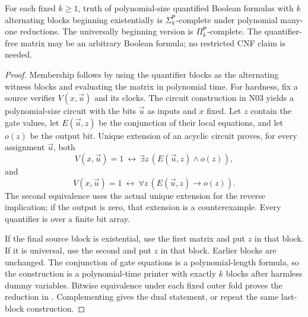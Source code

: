 \begin{theorem}\label{thm:A03}
For each fixed $k\ge1$, truth of polynomial-size quantified Boolean formulas with $k$ alternating blocks beginning existentially is $\Sigma_k^{\mathsf P}$-complete under polynomial many-one reductions. The universally beginning version is $\Pi_k^{\mathsf P}$-complete. The quantifier-free matrix may be an arbitrary Boolean formula; no restricted CNF claim is needed.
\end{theorem}
\begin{proof}
Membership follows by using the quantifier blocks as the alternating witness blocks and evaluating the matrix in polynomial time. For hardness, fix a source verifier $V(x,\vec u)$ and its clocks. The circuit construction in N03 yields a polynomial-size circuit with the bits $\vec u$ as inputs and $x$ fixed. Let $z$ contain the gate values, let $E(\vec u,z)$ be the conjunction of their local equations, and let $o(z)$ be the output bit. Unique extension of an acyclic circuit proves, for every assignment $\vec u$, both
\[
 V(x,\vec u)=1\ \longleftrightarrow\ \exists z\,(E(\vec u,z)\land o(z)),
\]
and
\[
 V(x,\vec u)=1\ \longleftrightarrow\ \forall z\,(E(\vec u,z)\to o(z)).
\]
The second equivalence uses the actual unique extension for the reverse implication; if the output is zero, that extension is a counterexample. Every quantifier is over a finite bit array.

If the final source block is existential, use the first matrix and put $z$ in that block. If it is universal, use the second and put $z$ in that block. Earlier blocks are unchanged. The conjunction of gate equations is a polynomial-length formula, so the construction is a polynomial-time printer with exactly $k$ blocks after harmless dummy variables. Bitwise equivalence under each fixed outer fold proves the reduction in \ipra. Complementing gives the dual statement, or repeat the same last-block construction.
\end{proof}


